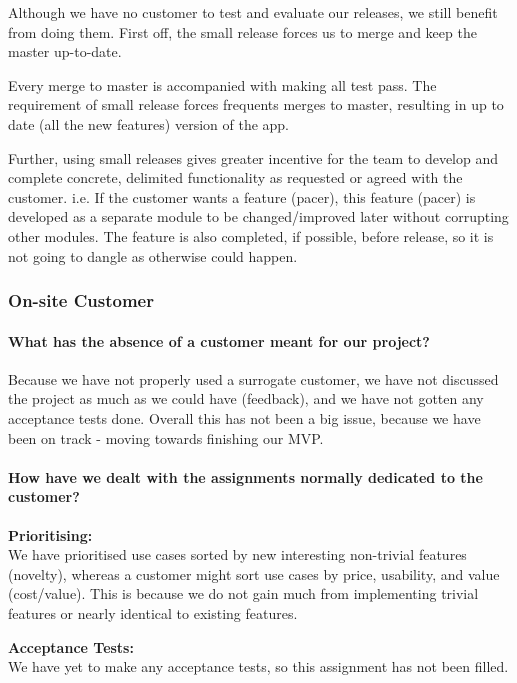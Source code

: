 Although we have no customer to test and evaluate our releases, we still benefit from doing them.
First off, the small release forces us to merge and keep the master up-to-date.

Every merge to master is accompanied with making all test pass. The requirement of small release forces frequents merges to master, resulting in up to date (all the new features) version of the app.

Further, using small releases gives greater incentive for the team to develop and complete concrete, delimited functionality %
as requested or agreed with the customer.
i.e. If the customer wants a feature (pacer), this feature (pacer) is developed as a separate module to be changed/improved later without corrupting other modules. The feature is also completed, if possible, before release, so it is not going to dangle as otherwise could happen.

\subsubsection{On-site Customer}

\paragraph{What has the absence of a customer meant for our project?}
Because we have not properly used a surrogate customer, we have not discussed the project as much as we could have (feedback), and we have not gotten any acceptance tests done. Overall this has not been a big issue, because we have been on track - moving towards finishing our MVP.

\paragraph{How have we dealt with the assignments normally dedicated to the customer?}
\textbf{Prioritising:}\\
We have prioritised use cases sorted by new interesting non-trivial features (novelty), whereas a customer might sort use cases by price, usability, and value (cost/value).
This is because we do not gain much from implementing trivial features or nearly identical to existing features.

\textbf{Acceptance Tests:}\\
We have yet to make any acceptance tests, so this assignment has not been filled.

